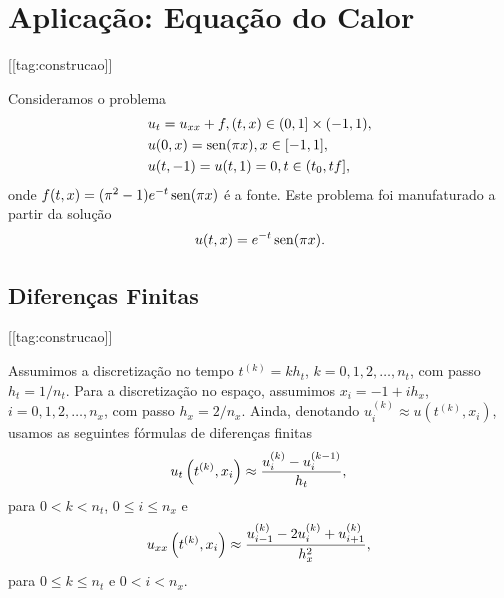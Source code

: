 \section{Aplicação: Equação do Calor}\label{cap_mlp_sec_calor}
[[tag:construcao]]

Consideramos o problema
\begin{subequations}\label{cap_mlp_sec_calor:eq:prob}
  \begin{align}
    &u_t = u_{xx} + f, (t,x)\in (0, 1] \times (-1, 1),\\
    &u(0,x) = \operatorname{sen}(\pi x), x\in [-1, 1],\\
    &u(t,-1) = u(t,1) = 0, t\in (t_0, tf],
  \end{align}
\end{subequations}
onde $f(t,x) = (\pi^2 - 1)e^{-t}\operatorname{sen}(\pi x)$ é a fonte. Este problema foi manufaturado a partir da solução
\begin{equation}
  u(t,x) = e^{-t}\operatorname{sen}(\pi x).
\end{equation}

\subsection{Diferenças Finitas}
[[tag:construcao]]

Assumimos a discretização no tempo $t^{(k)} = kh_t$, $k = 0, 1, 2, \dotsc, n_t$, com passo $h_t = 1/n_t$. Para a discretização no espaço, assumimos $x_{i} = -1 + ih_x$, $i = 0, 1, 2, \dotsc, n_x$, com passo $h_x = 2/n_x$. Ainda, denotando $u^{(k)}_i \approx u\left(t^{(k)}, x_i\right)$, usamos as seguintes fórmulas de diferenças finitas
\begin{equation}
  u_t\left(t^{(k)}, x_i\right) \approx \frac{u_i^{(k)} - u_i^{(k-1)}}{h_t},\\
\end{equation}
para $0<k<n_t$, $0\leq i\leq n_x$ e
\begin{equation}
  u_{xx}\left(t^{(k)}, x_i\right) \approx \frac{u_{i-1}^{(k)} - 2u_i^{(k)} + u_{i+1}^{(k)}}{h_x^2},\\
\end{equation}
para $0\leq k\leq n_t$ e $0 < i < n_x$.

